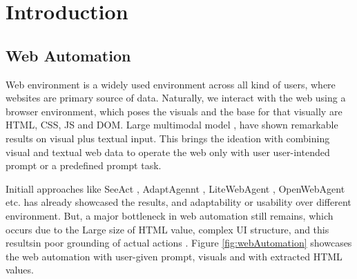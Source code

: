 \chapter{Introduction}

\section{Web Automation}

Web environment is a widely used environment across all kind of users, where websites are primary source of data. Naturally, we interact with the web using a browser environment, which poses the visuals and the base for that visually are HTML, CSS, JS and DOM. Large multimodal model \cite{LMM:Citation}, have shown remarkable results on visual plus textual input. This brings the ideation with combining visual and textual web data to operate the web only with user user-intended prompt or a predefined prompt task.

Initiall approaches like SeeAct \cite{SeeAct}, AdaptAgennt \cite{FewShotLearning:verma2024adaptagentadaptingmultimodalweb}, LiteWebAgent \cite{zhang2025litewebagentopensourcesuitevlmbased}, OpenWebAgent \cite{iong2024openwebagent} etc. has already showcased the results, and adaptability or usability over different environment. But, a major bottleneck in web automation still remains, which occurs due to the Large size of HTML value, complex UI structure, and this resultsin poor grounding of actual actions \cite{SeeAct}. Figure \ref{fig:webAutomation} showcases the web automation with user-given prompt, visuals and with extracted HTML values.

